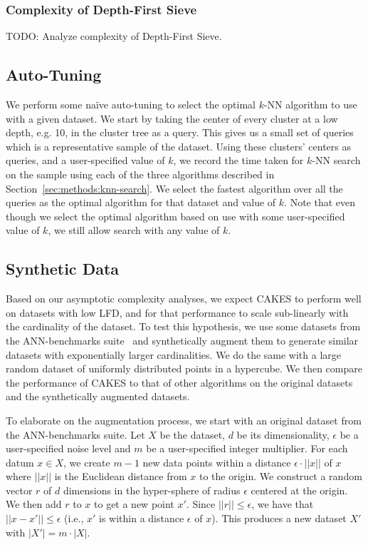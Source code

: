 \subsubsection{Complexity of Depth-First Sieve}
\label{sec:methods:knn-search:depth-first-sieve-complexity}

TODO: Analyze complexity of Depth-First Sieve.


\subsection{Auto-Tuning}
\label{sec:methods:auto-tuning}

We perform some na\"{i}ve auto-tuning to select the optimal $k$-NN algorithm to use with a given dataset.
We start by taking the center of every cluster at a low depth, e.g. 10, in the cluster tree as a query.
This gives us a small set of queries which is a representative sample of the dataset.
Using these clusters' centers as queries, and a user-specified value of $k$, we record the time taken for $k$-NN search on the sample using each of the three algorithms described in Section~\ref{sec:methods:knn-search}.
We select the fastest algorithm over all the queries as the optimal algorithm for that dataset and value of $k$.
Note that even though we select the optimal algorithm based on use with some user-specified value of $k$, we still allow search with any value of $k$.


\subsection{Synthetic Data}
\label{sec:methods:synthetic-data}

Based on our asymptotic complexity analyses, we expect CAKES to perform well on datasets with low LFD, and for that performance to scale sub-linearly with the cardinality of the dataset.
To test this hypothesis, we use some datasets from the ANN-benchmarks suite~\cite{aumuller2020ann} and synthetically augment them to generate similar datasets with exponentially larger cardinalities.
We do the same with a large random dataset of uniformly distributed points in a hypercube.
We then compare the performance of CAKES to that of other algorithms on the original datasets and the synthetically augmented datasets.

To elaborate on the augmentation process, we start with an original dataset from the ANN-benchmarks suite.
Let $X$ be the dataset, $d$ be its dimensionality, $\epsilon$ be a user-specified noise level and $m$ be a user-specified integer multiplier.
For each datum $x \in X$, we create $m - 1$ new data points within a distance $\epsilon \cdot ||x||$ of $x$ where $||x||$ is the Euclidean distance from $x$ to the origin.
We construct a random vector $r$ of $d$ dimensions in the hyper-sphere of radius $\epsilon$ centered at the origin.
We then add $r$ to $x$ to get a new point $x'$.
Since $||r|| \leq \epsilon$, we have that $||x - x'|| \leq \epsilon$ (i.e., $x'$ is within a distance $\epsilon$ of $x$).
This produces a new dataset $X'$ with $|X'| = m \cdot |X|$.


